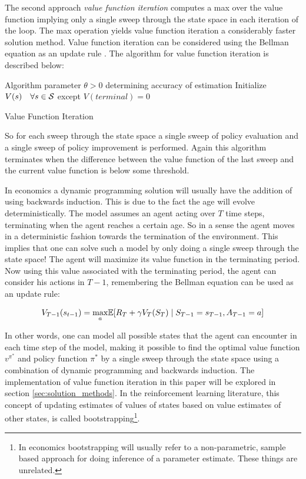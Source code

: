 The second approach \textit{value function iteration} computes a max over the value function implying only a single sweep through the state space in each iteration of the loop. The max operation yields value function iteration a considerably faster solution method. Value function iteration can be considered using the Bellman equation as an update rule \parencite{sutton_reinforcement_2018}. The algorithm for value function iteration is described below:

\begin{algorithm}[H]
\SetAlgoLined
{}
 Algorithm parameter $\theta > 0$ determining accuracy of estimation\;
 Initialize $V(s)\quad \forall s \in \mathcal{S}$ except $V(terminal) = 0$\;
 \caption{Value Function Iteration}
\end{algorithm}

 So for each sweep through the state space a single sweep of policy evaluation and a single sweep of policy improvement is performed. Again this algorithm terminates when the difference between the value function of the last sweep and the current value function is below some threshold.
 
 In economics a dynamic programming solution will usually have the addition of using backwards induction. This is due to the fact the age will evolve deterministically. The model assumes an agent acting over $T$ time steps, terminating when the agent reaches a certain age. So in a sense the agent moves in a deterministic fashion towards the termination of the environment. This implies that one can solve such a model by only doing a single sweep through the state space! The agent will maximize its value function in the terminating period. Now using this value associated with the terminating period, the agent can consider his actions in $T-1$, remembering the Bellman equation can be used as an update rule:
 
 \begin{equation}
     V_{T-1}(s_{t-1}) = \underset{a}{\max}\mathbb{E} [R_T + \gamma V_T (S_T) \mid S_{T-1} = s_{T-1}, A_{T-1} = a]
 \end{equation}
 
 In other words, one can model all possible states that the agent can encounter in each time step of the model, making it possible to find the optimal value function $v^{\pi^*}$ and policy function $\pi^{*}$ by a single sweep through the state space using a combination of dynamic programming and backwards induction. The implementation of value function iteration in this paper will be explored in section \ref{sec:solution_methods}. In the reinforcement learning literature, this concept of updating estimates of values of states based on value estimates of other states, is called bootstrapping\footnote{In economics bootstrapping will usually refer to a non-parametric, sample based approach for doing inference of a parameter estimate. These things are unrelated.}. 

